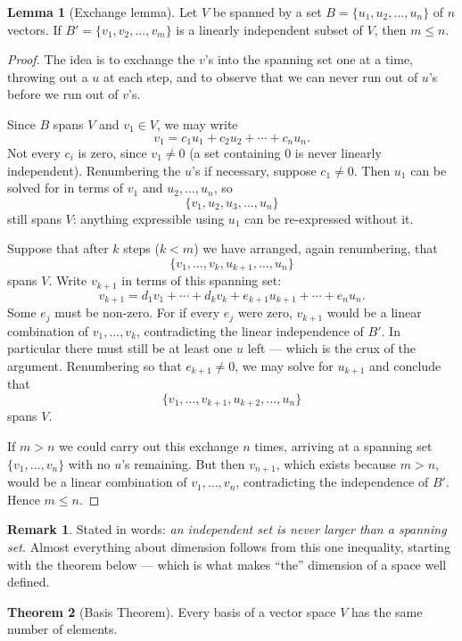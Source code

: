 \documentclass[11pt,a4paper]{article}
\theoremstyle{definition}
\newtheorem{thm}{Theorem}[subsection]
\newtheorem{lem}[thm]{Lemma}
\newtheorem*{remark}{Remark}
\begin{document}
\begin{lem}[Exchange lemma]\label{lem:basis-bound}
Let $V$ be spanned by a set $B=\{u_1,u_2,\dots,u_n\}$ of $n$ vectors. If
$B'=\{v_1,v_2,\dots,v_m\}$ is a linearly independent subset of $V$, then
$m\leq n$.
\end{lem}

\begin{proof}
The idea is to exchange the $v$'s into the spanning set one at a time,
throwing out a $u$ at each step, and to observe that we can never run out of
$u$'s before we run out of $v$'s.

Since $B$ spans $V$ and $v_1\in V$, we may write
$$v_1=c_1u_1+c_2u_2+\cdots+c_nu_n.$$
Not every $c_i$ is zero, since $v_1\neq 0$ (a set containing $0$ is never
linearly independent). Renumbering the $u$'s if necessary, suppose $c_1\neq 0$.
Then $u_1$ can be solved for in terms of $v_1$ and $u_2,\dots,u_n$, so
$$\{v_1,u_2,u_3,\dots,u_n\}$$
still spans $V$: anything expressible using $u_1$ can be re-expressed without
it.

Suppose that after $k$ steps ($k<m$) we have arranged, again renumbering, that
$$\{v_1,\dots,v_k,u_{k+1},\dots,u_n\}$$
spans $V$. Write $v_{k+1}$ in terms of this spanning set:
$$v_{k+1}=d_1v_1+\cdots+d_kv_k+e_{k+1}u_{k+1}+\cdots+e_nu_n.$$
Some $e_j$ must be non-zero. For if every $e_j$ were zero, $v_{k+1}$ would be a
linear combination of $v_1,\dots,v_k$, contradicting the linear independence of
$B'$. In particular there must still be at least one $u$ left --- which is the
crux of the argument. Renumbering so that $e_{k+1}\neq 0$, we may solve for
$u_{k+1}$ and conclude that
$$\{v_1,\dots,v_{k+1},u_{k+2},\dots,u_n\}$$
spans $V$.

If $m>n$ we could carry out this exchange $n$ times, arriving at a spanning set
$\{v_1,\dots,v_n\}$ with no $u$'s remaining. But then $v_{n+1}$, which exists
because $m>n$, would be a linear combination of $v_1,\dots,v_n$, contradicting
the independence of $B'$. Hence $m\leq n$.
\end{proof}

\begin{remark}
Stated in words: \emph{an independent set is never larger than a spanning set.}
Almost everything about dimension follows from this one inequality, starting
with the theorem below --- which is what makes ``the'' dimension of a space
well defined.
\end{remark}


\begin{thm}[Basis Theorem]
Every basis of a vector space $V$ has the same number of elements.
\end{thm}
\end{document}
